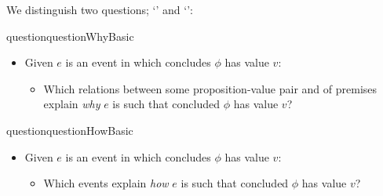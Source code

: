 \begin{note}
  We distinguish two questions; `\qWhy{}' and `\qHow{}':

  \begin{restatable}[\qWhy{}]{question}{questionWhyBasic}
    \label{q:why}
    \begin{itemize}
    \item
      Given \(e\) is an event in which \vAgent{} concludes \(\phi\) has value \(v\):
      \begin{itemize}
      \item
        Which relations between some proposition-value pair and \poP{} of premises explain \emph{why} \(e\) is such that \vAgent{} concluded \(\phi\) has value \(v\)?
      \end{itemize}
    \end{itemize}
    \vspace{-\baselineskip}
  \end{restatable}

  \begin{restatable}[\qHow{}]{question}{questionHowBasic}
    \label{q:how}
    \begin{itemize}
    \item
      Given \(e\) is an event in which \vAgent{} concludes \(\phi\) has value \(v\):
      \begin{itemize}
      \item
        Which events explain \emph{how} \(e\) is such that \vAgent{} concluded \(\phi\) has value \(v\)?
      \end{itemize}
    \end{itemize}
    \vspace{-\baselineskip}
  \end{restatable}
\end{note}

